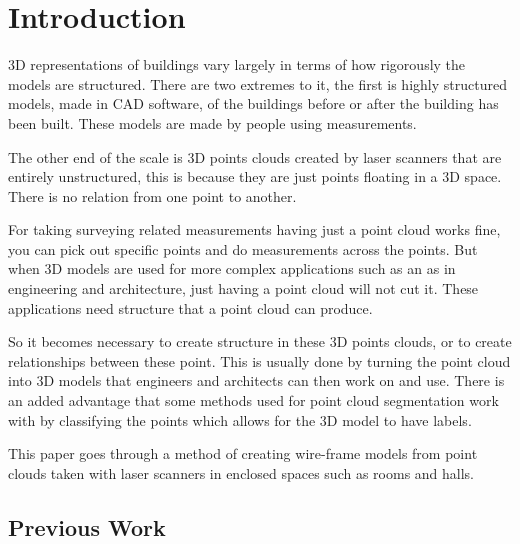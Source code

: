 
\section{Introduction}



3D representations of buildings vary largely in terms of how rigorously the models are structured. There are two extremes to it, the first is highly structured models, made in CAD software, of the buildings before or after the building has been built. These models are made by people using measurements.

The other end of the scale is 3D points clouds created by laser scanners that are entirely unstructured, this is because they are just points floating in a 3D space. There is no relation from one point to another.

For taking surveying related measurements having just a point cloud works fine, you can pick out specific points and do measurements across the points. But when 3D models are used for more complex applications such as an as in engineering and architecture, just having a point cloud will not cut it. These applications need structure that a point cloud can produce.

So it becomes necessary to create structure in these 3D points clouds, or to create relationships between these point. This is usually done by turning the point cloud into 3D models that engineers and architects can then work on and use. There is an added advantage that some methods used for point cloud segmentation work with by classifying the points which allows for the 3D model to have labels.



This paper goes through a method of creating wire-frame models from point clouds taken with laser scanners in enclosed spaces such as rooms and halls. 

\subsection{Previous Work}

